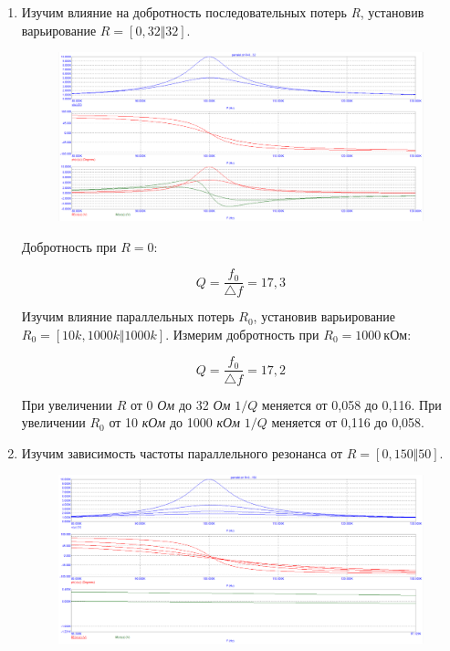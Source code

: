 \documentclass[a4paper, 12pt]{article}%
\begin{document}
\begin{enumerate}
\item Изучим влияние на добротность последовательных потерь \textit{R}, установив варьирование $R = [0, 32 \Vert 32]$. 

\begin{figure}[h!]
\centering
\includegraphics[scale=0.4]{parallel_AC1.png}
\label{fig:Image1}
\end{figure} 

Добротность при $R = 0$:

\[Q = \frac{f_0}{\triangle f} = 17,3\]

Изучим влияние параллельных потерь $R_0$, установив варьирование $R_0 = [10k, 1000k \Vert 1000k]$. Измерим добротность при $R_0 = 1000 \: \textit{кОм}$:

\[Q = \frac{f_0}{\triangle f} = 17,2\]

При увеличении $R$ от 0 \textit{Ом} до 32 \textit{Ом} $1/Q$ меняется от 0,058 до 0,116. При увеличении $R_0$ от 10 \textit{кОм} до 1000 \textit{кОм} $1/Q$ меняется от 0,116 до 0,058.

\item Изучим зависимость частоты параллельного резонанса от $R = [0, 150 \Vert 50]$.

\begin{figure}[h!]
\centering
\includegraphics[scale=0.4]{parallel_AC2.png}
\label{fig:Image1}
\end{figure} 


\end{enumerate}
\end{document}
